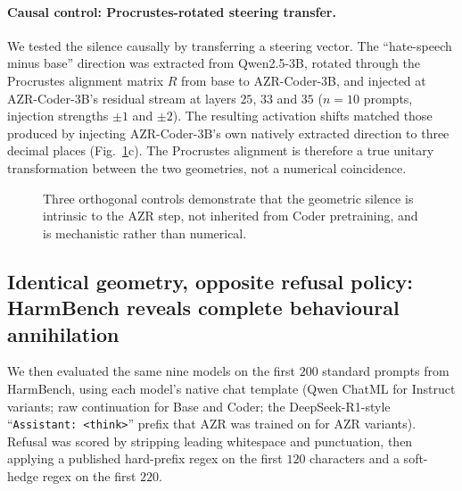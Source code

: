 \documentclass[11pt,a4paper]{article}
\begin{document}
\paragraph{Causal control: Procrustes-rotated steering transfer.}
We tested the silence causally by transferring a steering vector. The
``hate-speech minus base'' direction was extracted from Qwen2.5-3B,
rotated through the Procrustes alignment matrix $R$ from base to
AZR-Coder-3B, and injected at AZR-Coder-3B's residual stream at layers
$25$, $33$ and $35$ ($n = 10$ prompts, injection strengths $\pm 1$ and
$\pm 2$). The resulting activation shifts matched those produced by
injecting AZR-Coder-3B's own natively extracted direction to three
decimal places (Fig.~\ref{fig:controls}c). The Procrustes alignment is
therefore a true unitary transformation between the two geometries, not
a numerical coincidence.

\begin{figure}[t]
  \centering
  \caption{Three orthogonal controls demonstrate that the geometric silence
    is intrinsic to the AZR step, not inherited from Coder pretraining,
    and is mechanistic rather than numerical.}
  \label{fig:controls}
\end{figure}

\subsection{Identical geometry, opposite refusal policy:
HarmBench reveals complete behavioural annihilation}
\label{sec:behaviour}

We then evaluated the same nine models on the first $200$ standard
prompts from HarmBench, using each model's native chat template (Qwen
ChatML for Instruct variants; raw continuation for Base and Coder; the
DeepSeek-R1-style ``\texttt{Assistant: <think>}'' prefix that AZR was
trained on for AZR variants). Refusal was scored by stripping leading
whitespace and punctuation, then applying a published hard-prefix regex
on the first $120$ characters and a soft-hedge regex on the first $220$.
\end{document}
